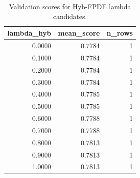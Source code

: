 \begin{table}[t]
\caption{Validation scores for Hyb-FPDE lambda candidates.}
\label{tab:lambda_distribution_computed}
\centering
\begin{tabular}{rrr}
\toprule
lambda\_hyb & mean\_score & n\_rows \\
\midrule
0.0000 & 0.7784 & 1 \\
0.1000 & 0.7784 & 1 \\
0.2000 & 0.7784 & 1 \\
0.3000 & 0.7784 & 1 \\
0.4000 & 0.7785 & 1 \\
0.5000 & 0.7785 & 1 \\
0.6000 & 0.7788 & 1 \\
0.7000 & 0.7788 & 1 \\
0.8000 & 0.7813 & 1 \\
0.9000 & 0.7813 & 1 \\
1.0000 & 0.7813 & 1 \\
\bottomrule
\end{tabular}

\end{table}

